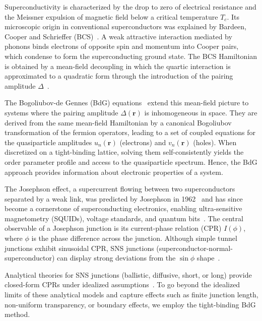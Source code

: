 \documentclass[11pt,a4paper,twoside,openany]{report}
\begin{document}
Superconductivity is characterized by the drop to zero of electrical resistance and the Meissner expulsion of magnetic field below a critical temperature \(T_c\). Its microscopic origin in conventional superconductors was explained by Bardeen, Cooper and Schrieffer (BCS)~\cite{bardeen_theory_1957}. A weak attractive interaction mediated by phonons binds electrons of opposite spin and momentum into Cooper pairs, which condense to form the superconducting ground state. The BCS Hamiltonian is obtained by a mean-field decoupling in which the quartic interaction is approximated to a quadratic form through the introduction of the pairing amplitude $\Delta$~\cite{zhu_bogoliubov-gennes_2016, gennes_superconductivity_2018}.

The Bogoliubov-de Gennes (BdG) equations~\cite{gennes_superconductivity_2018} extend this mean-field picture to systems where the pairing amplitude \(\Delta(\mathbf{r})\) is inhomogeneous in space. They are derived from the same mean-field Hamiltonian by a canonical Bogoliubov transformation of the fermion operators, leading to a set of coupled equations for the quasiparticle amplitudes \(u_n(\mathbf{r})\) (electrons) and \(v_n(\mathbf{r})\) (holes). When discretized on a tight-binding lattice, solving them self-consistently yields the order parameter profile and access to the quasiparticle spectrum. Hence, the BdG approach provides information about electronic properties of a system.

The Josephson effect, a supercurrent flowing between two superconductors separated by a weak link, was predicted by Josephson in 1962~\cite{josephson_possible_1962} and has since become a cornerstone of superconducting electronics, enabling ultra-sensitive magnetometry (SQUIDs), voltage standards, and quantum bits~\cite{clarke_squid_2004,devoret2013superconducting}. The central observable of a Josephson junction is its current-phase relation (CPR) \(I(\phi)\), where \(\phi\) is the phase difference across the junction. Although simple tunnel junctions exhibit sinusoidal CPR, SNS junctions (superconductor-normal-superconductor) can display strong deviations from the \(\sin\phi\) shape~\cite{golubov_current-phase_2004}.

Analytical theories for SNS junctions (ballistic, diffusive, short, or long) provide closed-form CPRs under idealized assumptions~\cite{golubov_current-phase_2004,sonin_theory_2026, bagwell_suppression_1992, beenaker_1992, bardeen_theory_1957,ishii_josephson_1970}. To go beyond the idealized limits of these analytical models and capture effects such as finite junction length, non-uniform transparency, or boundary effects, we employ the tight-binding BdG method.
\end{document}
